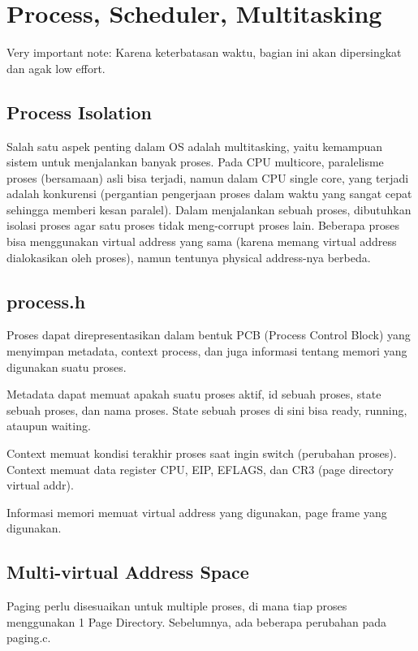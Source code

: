 \chapter{Process, Scheduler, Multitasking}

Very important note: Karena keterbatasan waktu, bagian ini akan dipersingkat dan agak low effort.

\section{Process Isolation}

Salah satu aspek penting dalam OS adalah multitasking, yaitu kemampuan sistem untuk menjalankan banyak proses. Pada CPU multicore, paralelisme proses (bersamaan) asli bisa terjadi, namun dalam CPU single core, yang terjadi adalah konkurensi (pergantian pengerjaan proses dalam waktu yang sangat cepat sehingga memberi kesan paralel). Dalam menjalankan sebuah proses, dibutuhkan isolasi proses agar satu proses tidak meng-corrupt proses lain. Beberapa proses bisa menggunakan virtual address yang sama (karena memang virtual address dialokasikan oleh proses), namun tentunya physical address-nya berbeda.

\section{process.h}

Proses dapat direpresentasikan dalam bentuk PCB (Process Control Block) yang menyimpan metadata, context process, dan juga informasi tentang memori yang digunakan suatu proses.

Metadata dapat memuat apakah suatu proses aktif, id sebuah proses, state sebuah proses, dan nama proses. State sebuah proses di sini bisa ready, running, ataupun waiting.

Context memuat kondisi terakhir proses saat ingin switch (perubahan proses). Context memuat data register CPU, EIP, EFLAGS, dan CR3 (page directory virtual addr).

Informasi memori memuat virtual address yang digunakan, page frame yang digunakan.

\section{Multi-virtual Address Space}

Paging perlu disesuaikan untuk multiple proses, di mana tiap proses menggunakan 1 Page Directory. Sebelumnya, ada beberapa perubahan pada paging.c.

